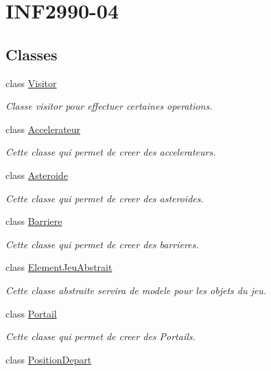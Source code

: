 \hypertarget{group___i_n_f2990-04}{\section{I\-N\-F2990-\/04}
\label{group___i_n_f2990-04}
}
\subsection*{Classes}
\begin{DoxyCompactItemize}
\item 
class \hyperlink{class_visitor}{Visitor}
\begin{DoxyCompactList}\small\item\em Classe visitor pour effectuer certaines operations. \end{DoxyCompactList}\item 
class \hyperlink{class_accelerateur}{Accelerateur}
\begin{DoxyCompactList}\small\item\em Cette classe qui permet de creer des accelerateurs. \end{DoxyCompactList}\item 
class \hyperlink{class_asteroide}{Asteroide}
\begin{DoxyCompactList}\small\item\em Cette classe qui permet de creer des asteroides. \end{DoxyCompactList}\item 
class \hyperlink{class_barriere}{Barriere}
\begin{DoxyCompactList}\small\item\em Cette classe qui permet de creer des barrieres. \end{DoxyCompactList}\item 
class \hyperlink{class_element_jeu_abstrait}{Element\-Jeu\-Abstrait}
\begin{DoxyCompactList}\small\item\em Cette classe abstraite servira de modele pour les objets du jeu. \end{DoxyCompactList}\item 
class \hyperlink{class_portail}{Portail}
\begin{DoxyCompactList}\small\item\em Cette classe qui permet de creer des Portails. \end{DoxyCompactList}\item 
class \hyperlink{class_position_depart}{Position\-Depart}

\end{DoxyCompactItemize}
